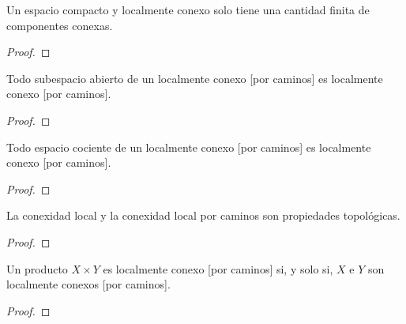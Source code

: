 \begin{proposición}
    Un espacio compacto y localmente conexo solo tiene una cantidad finita de componentes conexas.
\end{proposición}
\begin{proof}
\end{proof}
\begin{proposición}
    Todo subespacio abierto de un localmente conexo [por caminos] es localmente conexo [por caminos].
\end{proposición}
\begin{proof}
\end{proof}
\begin{proposición}
    Todo espacio cociente de un localmente conexo [por caminos] es localmente conexo [por caminos].
\end{proposición}
\begin{proof}
\end{proof}
\begin{corolario}
    La conexidad local y la conexidad local por caminos son propiedades topológicas.
\end{corolario}
\begin{proof}
\end{proof}
\begin{proposición}
    Un producto $X \times Y$ es localmente conexo [por caminos] si, y solo si, $X$ e $Y$ son localmente conexos [por caminos].
\end{proposición}
\begin{proof}
\end{proof}
